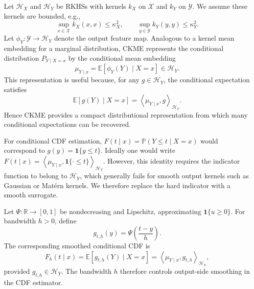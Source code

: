 \documentclass[11pt]{article}
\newcommand{\Xcal}{\mathcal X}
\newcommand{\Ycal}{\mathcal Y}
\newcommand{\Hcal}{\mathcal H}
\newcommand{\Pp}{\mathbb P}
\newcommand{\E}{\mathbb E}
\newcommand{\R}{\mathbb R}
\newcommand{\ind}{\mathbf 1}
\newcommand{\inner}[2]{\left\langle #1,#2 \right\rangle}
\begin{document}
Let \(\Hcal_X\) and \(\Hcal_Y\) be RKHSs with kernels \(k_X\) on \(\Xcal\) and \(k_Y\) on \(\Ycal\). We assume these kernels are bounded, e.g.,
\[
  \sup_{x\in\Xcal}k_X(x,x)\le \kappa_X^2,
  \qquad
  \sup_{y\in\Ycal}k_Y(y,y)\le \kappa_Y^2.
\]
Let \(\phi_Y:\Ycal\to\Hcal_Y\) denote the output feature map. Analogous to a kernel mean embedding for a marginal distribution, CKME represents the conditional distribution \(P_{Y\mid X=x}\) by the conditional mean embedding
\[
  \mu_{Y\mid x}=\E[\phi_Y(Y)\mid X=x]\in \Hcal_Y.
\]
This representation is useful because, for any \(g\in\Hcal_Y\), the conditional expectation satisfies
\[
  \E[g(Y)\mid X=x]=\inner{\mu_{Y\mid x}}{g}_{\Hcal_Y}.
\]
Hence CKME provides a compact distributional representation from which many conditional expectations can be recovered.

For conditional CDF estimation, \(F(t\mid x)=\Pp(Y\le t\mid X=x)\) would correspond to \(g(y)=\ind\{y\le t\}\). Ideally one would write \(F(t\mid x)=\inner{\mu_{Y\mid x}}{\ind\{\cdot\le t\}}_{\Hcal_Y}\). However, this identity requires the indicator function to belong to \(\Hcal_Y\), which generally fails for smooth output kernels such as Gaussian or Matérn kernels. We therefore replace the hard indicator with a smooth surrogate.

Let \(\Psi:\R\to[0,1]\) be nondecreasing and Lipschitz, approximating \(\ind\{u\ge0\}\). For bandwidth \(h>0\), define
\[
  g_{t,h}(y)=\Psi\!\left(\frac{t-y}{h}\right).
\]
The corresponding smoothed conditional CDF is
\[
  F_h(t\mid x)=\E[g_{t,h}(Y)\mid X=x]
  =
  \inner{\mu_{Y\mid x}}{g_{t,h}}_{\Hcal_Y},
\]
provided \(g_{t,h}\in\Hcal_Y\). The bandwidth \(h\) therefore controls output-side smoothing in the CDF estimator.
\end{document}
